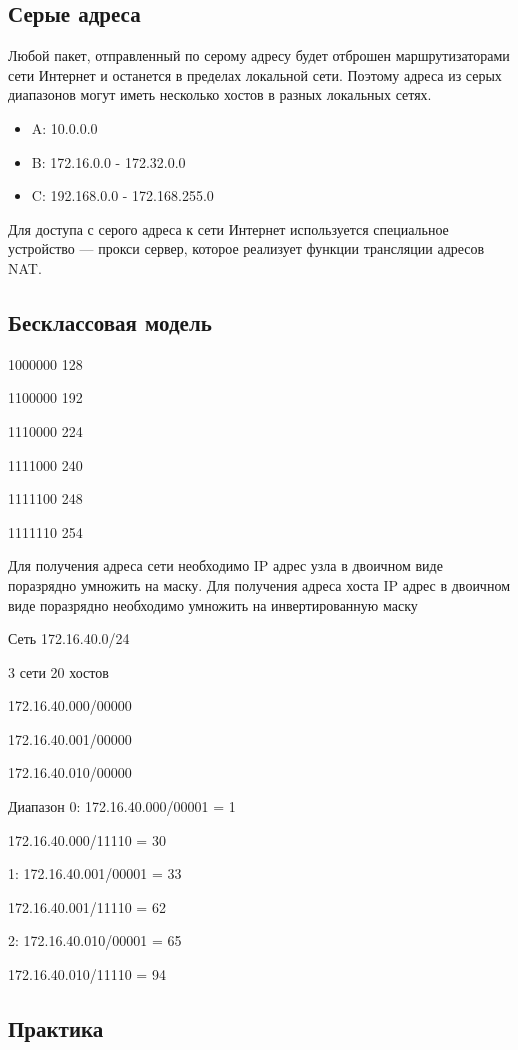 \documentclass[12pt, russian, oneside, article]{ncc}
\begin{document}
\subsection{Серые адреса}
\label{sec-6_4}


Любой пакет, отправленный по серому адресу будет отброшен маршрутизаторами сети Интернет и останется в пределах локальной сети. Поэтому адреса из серых диапазонов могут иметь несколько хостов в разных локальных сетях.

\begin{itemize}
\item A: 10.0.0.0
\item B: 172.16.0.0 - 172.32.0.0
\item C: 192.168.0.0 - 172.168.255.0
\end{itemize}

Для доступа с серого адреса к сети Интернет используется специальное устройство --- прокси сервер, которое реализует функции трансляции адресов NAT.
\subsection{Бесклассовая модель}
\label{sec-6_5}


1000000 128

1100000 192

1110000 224

1111000 240

1111100 248

1111110 254

Для получения адреса сети необходимо IP адрес узла в двоичном виде поразрядно умножить на маску. Для получения адреса хоста IP адрес в двоичном виде поразрядно необходимо умножить на инвертированную маску

Сеть 172.16.40.0/24

3 сети 20 хостов

172.16.40.000/00000

172.16.40.001/00000

172.16.40.010/00000

Диапазон
0: 172.16.40.000/00001 = 1

   172.16.40.000/11110 = 30

1: 172.16.40.001/00001 = 33

   172.16.40.001/11110 = 62

2: 172.16.40.010/00001 = 65

   172.16.40.010/11110 = 94
\subsection{Практика}
\label{sec-6_6}
\end{document}
